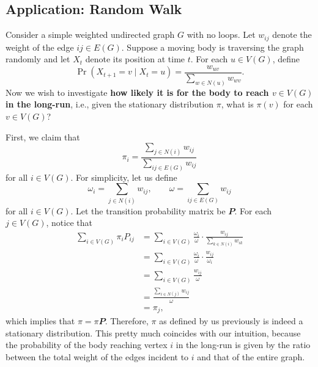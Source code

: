 \documentclass[math]{amznotes}
\theoremstyle{remark}
\begin{document}
\subsection{Application: Random Walk}
Consider a simple weighted undirected graph $G$ with no loops. Let $w_{ij}$ denote the weight of the edge $ij \in E\left(G\right)$. Suppose a moving body is traversing the graph randomly and let $X_t$ denote its position at time $t$. For each $u \in V\left(G\right)$, define 
\begin{equation*}
    \Pr\left(X_{t + 1} = v \mid X_t = u\right) = \frac{w_{uv}}{\sum_{w \in N\left(u\right)}w_{wv}}.
\end{equation*}
Now we wish to investigate \textbf{how likely it is for the body to reach $v \in V\left(G\right)$ in the long-run}, i.e., given the stationary distribution $\pi$, what is $\pi\left(v\right)$ for each $v \in V\left(G\right)$?

First, we claim that 
\begin{equation*}
    \pi_i = \frac{\sum_{j \in N\left(i\right)}w_{ij}}{\sum_{ij \in E\left(G\right)}w_{ij}}
\end{equation*}
for all $i \in V\left(G\right)$. For simplicity, let us define 
\begin{equation*}
    \omega_i = \sum_{j \in N\left(i\right)}w_{ij}, \qquad \omega = \sum_{ij \in E\left(G\right)}w_{ij}
\end{equation*}
for all $i \in V\left(G\right)$. Let the transition probability matrix be $\mathbfit{P}$. For each $j \in V\left(G\right)$, notice that 
\begin{align*}
    \sum_{i \in V\left(G\right)}\pi_iP_{ij} & = \sum_{i \in V\left(G\right)}\frac{\omega_i}{\omega} \cdot \frac{w_{ij}}{\sum_{k \in N\left(i\right)}w_{ik}} \\
    & = \sum_{i \in V\left(G\right)}\frac{\omega_i}{\omega} \cdot \frac{w_{ij}}{\omega_i} \\
    & = \sum_{i \in V\left(G\right)}\frac{w_{ij}}{\omega} \\
    & = \frac{\sum_{i \in N\left(j\right)}w_{ij}}{\omega} \\
    & = \pi_j,
\end{align*}
which implies that $\pi = \pi\mathbfit{P}$. Therefore, $\pi$ as defined by us previously is indeed a stationary distribution. This pretty much coincides with our intuition, because the probability of the body reaching vertex $i$ in the long-run is given by the ratio between the total weight of the edges incident to $i$ and that of the entire graph.
\end{document}
